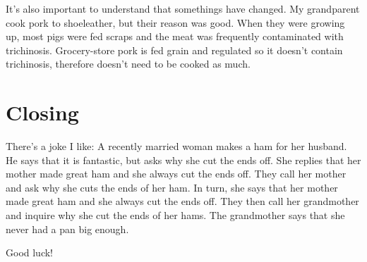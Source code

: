 It's also important to understand that somethings have changed. My grandparent cook pork to shoeleather, but their reason was good. When they were growing up, most pigs were fed scraps and the meat was frequently contaminated with trichinosis. Grocery-store pork is fed grain and regulated so it doesn't contain trichinosis, therefore doesn't need to be cooked as much.

\section{Closing}
There's a joke I like: A recently married woman makes a ham for her husband. He says that it is fantastic, but asks why she cut the ends off. She replies that her mother made great ham and she always cut the ends off. They call her mother and ask why she cuts the ends of her ham. In turn, she says that her mother made great ham and she always cut the ends off. They then call her grandmother and inquire why she cut the ends of her hams. The grandmother says that she never had a pan big enough.

Good luck!

